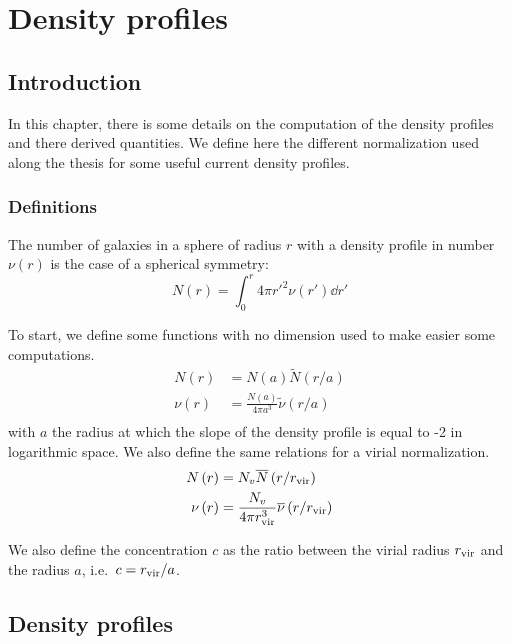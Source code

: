 \chapter{Density profiles}
\label{cha:profiles}

\section{Introduction}

In this chapter, there is some details on the computation of the density
profiles and there derived quantities. We define here the different
normalization used along the thesis for some useful current density profiles.

\subsection{Definitions}

The number of galaxies in a sphere of radius $r$ with a density profile in
number $\nu(r)$ is the case of a spherical symmetry:
%
\begin{equation}
    N\left(r\right)=\int_0^r4\pi {r'}^2 \nu(r')\dd{r'}
\end{equation}

To start, we define some functions with no dimension used to make easier some
computations.
%
\begin{eqnarray}
    N\left(r\right)&=N\left(a\right){\widetilde{N}\left(r/a\right)}\nonumber\\
    \nu\left(r\right)&=
        \frac{N\left(a\right)}{4\pi{a^3}}
        \widetilde\nu\left(r/a\right)\nonumber\\
\end{eqnarray}
%
with $a$ the radius at which the slope of the density profile is equal to -2 in
logarithmic space. We also define the same relations for a virial
normalization.
%
\begin{eqnarray}
    N\left(r\right)&={N_v}{\overline{N}\left(r/r_{\rm vir}\right)}\nonumber\\
    \nu\left(r\right)&=
        \frac{N_v}{4\pi r_{\rm vir}^3}\overline\nu\left(r/r_{\rm vir}\right)\nonumber\\
\end{eqnarray}

We also define the concentration $c$ as the ratio between the virial radius
$r_{\rm vir}$ and the radius $a$, i.e.\ $c=r_{\rm vir}/a$.

\section{Density profiles}
\label{sec:density_profiles}

